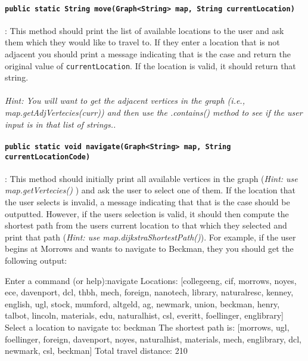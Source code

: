 \documentclass[a4paper]{article}
\begin{document}
\paragraph{\lstinline|public static String move(Graph<String> map, String
currentLocation)|}: This method should print the list of available locations to
the user and ask them which they would like to travel to. If they enter a
location that is not adjacent you should print a message indicating that is the
case and return the original value of \lstinline|currentLocation|. If the
location is valid, it should return that string.
\\ \vspace{0.2cm}\\
\textit{Hint: You will want to get the adjacent vertices in the graph (i.e.,
map.getAdjVertecies(curr)) and then use the .contains() method to see if the
user input is in that list of strings..}


\paragraph{\lstinline|public static void navigate(Graph<String> map, String
currentLocationCode)|}: This method should initially print all available
vertices in the graph (\textit{Hint: use map.getVertecies()} ) and ask the user to
select one of them. If the location that the user selects is invalid, a message 
indicating that that is the case should be outputted. However, if the users
selection is valid, it should then compute the shortest path from the users
current location to that which they selected and print that path (\textit{Hint:
use map.dijkstraShortestPath()}). For example, if the user begins at Morrows
and wants to navigate to Beckman, they you should get the following output:
\begin{shell}
Enter a command (or help):navigate
Locations: [collegeeng, cif, morrows, noyes, ece, davenport, dcl, thbh, mech, foreign, nanotech, library, naturalresc, kenney, english, ugl, stock, mumford, altgeld, ag, newmark, union, beckman, henry, talbot, lincoln, materials, edu, naturalhist, csl, everitt, foellinger, englibrary]
Select a location to navigate to: beckman
The shortest path is: [morrows, ugl, foellinger, foreign, davenport, noyes, naturalhist, materials, mech, englibrary, dcl, newmark, csl, beckman]
Total travel distance: 210
\end{shell}
\end{document}
